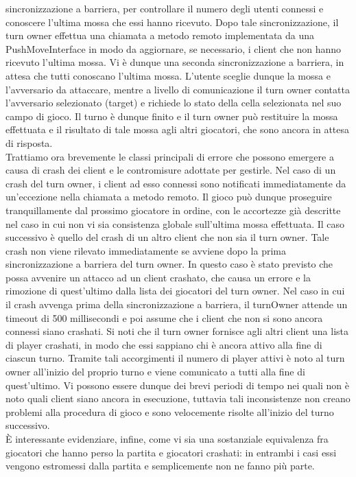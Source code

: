 sincronizzazione a barriera, per controllare il numero degli utenti connessi e 
conoscere l'ultima mossa che essi hanno ricevuto. Dopo tale sincronizzazione, 
il turn owner effettua una chiamata a metodo remoto implementata da una 
PushMoveInterface in modo da aggiornare, se necessario, i client che non hanno 
ricevuto l'ultima mossa. Vi è dunque una seconda sincronizzazione a barriera, 
in attesa che tutti conoscano l'ultima mossa. L'utente sceglie dunque la 
mossa e l'avversario da attaccare, mentre a livello di comunicazione il turn 
owner contatta l'avversario selezionato (target) e richiede lo stato della 
cella selezionata nel suo campo di gioco. Il turno è dunque finito e il turn 
owner può restituire la mossa effettuata e il risultato di tale mossa agli 
altri giocatori, che sono ancora in attesa di risposta.
\\
Trattiamo ora brevemente le classi principali di errore che possono emergere a 
causa di crash dei client e le contromisure adottate per gestirle. Nel caso di 
un crash del turn owner, i client ad esso connessi sono notificati 
immediatamente da un'eccezione nella chiamata a metodo remoto. Il gioco può 
dunque proseguire tranquillamente dal prossimo giocatore in ordine, con le 
accortezze già descritte nel caso in cui non vi sia consistenza globale 
sull'ultima mossa effettuata. Il caso successivo è quello del crash di un altro 
client che non sia il turn owner. Tale crash non viene rilevato immediatamente 
se avviene dopo la prima sincronizzazione a barriera del turn owner. In questo 
caso è stato previsto che possa avvenire un attacco ad un client crashato, che 
causa un errore e la rimozione di quest'ultimo dalla lista dei giocatori del 
turn owner. Nel caso in cui il crash avvenga prima della sincronizzazione a 
barriera, il turnOwner attende un timeout di 500 %
millisecondi e poi assume che i client che non si sono ancora connessi siano 
crashati. Si noti che il turn owner fornisce agli altri client una lista di 
player crashati, in modo che essi sappiano chi è ancora attivo alla fine di 
ciascun turno. Tramite tali accorgimenti il numero di player attivi è noto al 
turn owner all'inizio del proprio turno e viene comunicato a tutti alla fine di 
quest'ultimo. Vi possono essere dunque dei brevi periodi di tempo nei quali non 
è noto quali client siano ancora in esecuzione, tuttavia tali inconsistenze non 
creano problemi alla procedura di gioco e sono velocemente risolte all'inizio 
del turno successivo.
\\
È interessante evidenziare, infine, come vi sia una sostanziale equivalenza fra 
giocatori che hanno perso la partita e giocatori crashati: in entrambi i casi 
essi vengono estromessi dalla partita e semplicemente non ne fanno più parte.